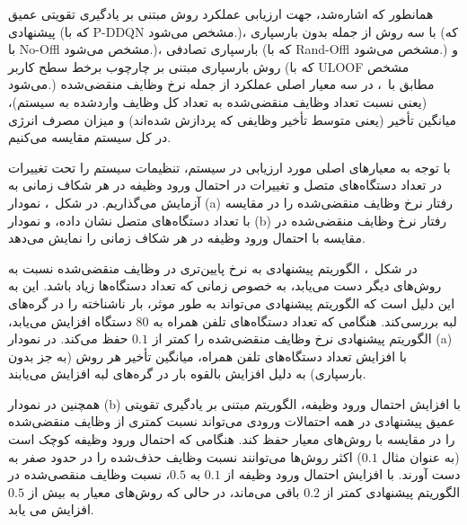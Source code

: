 




همانطور که اشاره‌شد، جهت ارزیابی عملکرد روش مبتنی بر یادگیری تقویتی عمیق پیشنهادی ‌(‌که با P-DDQN مشخص می‌شود.)، با سه روش از جمله بدون بارسپاری (که با No-Offl مشخص می‌شود.)، بارسپاری تصادفی (که با Rand-Offl مشخص می‌شود.) و روش بارسپاری مبتنی بر چارچوب برخط سطح کاربر (که با ULOOF مشخص می‌شود.) مطابق با~\cite{tang2020deep}، در سه معیار اصلی عملکرد از جمله نرخ وظایف منقضی‌شده (یعنی نسبت تعداد وظایف منقضی‌شده به تعداد کل وظایف واردشده به سیستم)، میانگین تأخیر (یعنی متوسط ​​تأخیر وظایفی که پردازش شده‌اند) و میزان مصرف انرژی در کل سیستم مقایسه می‌کنیم.




با توجه به معیارهای اصلی مورد ارزیابی در سیستم، تنظیمات سیستم را تحت تغییرات در تعداد دستگاه‌های متصل و تغییرات در احتمال ورود وظیفه در هر شکاف زمانی به آزمایش می‌گذاریم. در شکل~، نمودار (‌a) رفتار نرخ وظایف منقضی‌شده را در مقایسه با تعداد دستگاه‌های متصل نشان داده، و نمودار (b) رفتار نرخ وظایف منقضی‌شده در مقایسه با احتمال ورود وظیفه در هر شکاف زمانی را نمایش می‌دهد. 

در شکل~، الگوریتم پیشنهادی به نرخ پایین‌تری در وظایف منقضی‌شده نسبت به روش‌های دیگر دست می‌یابد، به خصوص زمانی که تعداد دستگاه‌ها زیاد باشد. این به این دلیل است که الگوریتم پیشنهادی می‌تواند به طور موثر، بار ناشناخته را در گره‌های لبه بررسی‌کند. هنگامی که تعداد دستگاه‌های تلفن همراه به $80$ دستگاه افزایش می‌یابد، الگوریتم پیشنهادی نرخ وظایف منقضی‌شده را کمتر از $‌‌0.1$ حفظ می‌کند. در نمودار (a) با افزایش تعداد دستگاه‌های تلفن همراه، میانگین تأخیر هر روش (به جز بدون بارسپاری) به دلیل افزایش بالقوه بار در گره‌های لبه افزایش می‌یابند. 

همچنین در نمودار (b) با افزایش احتمال ورود وظیفه، الگوریتم مبتنی بر یادگیری تقویتی عمیق پیشنهادی در همه احتمالات ورودی می‌تواند نسبت کمتری از وظایف منقضی‌شده را در مقایسه با روش‌های معیار حفظ کند. هنگامی که احتمال ورود وظیفه کوچک است (به عنوان مثال $0.1$) اکثر روش‌ها می‌توانند نسبت وظایف حذف‌شده را در حدود صفر به دست آورند. با افزایش احتمال ورود وظیفه از $0.1$ به $0.5$، نسبت وظایف منقصی‌شده در الگوریتم پیشنهادی کمتر از $0.2$ باقی می‌ماند، در حالی که روش‌های معیار به بیش از $0.5$ افزایش می یابد. 

